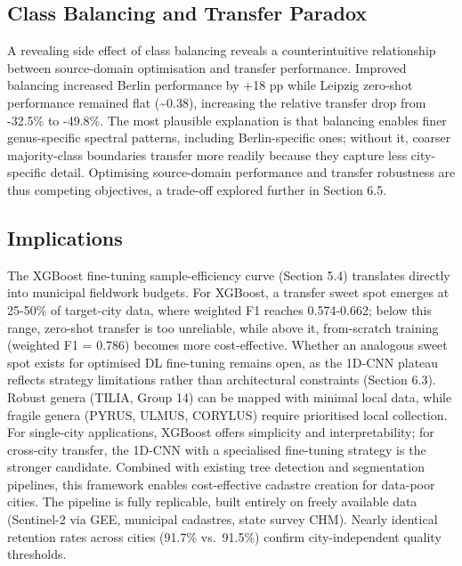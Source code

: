 \documentclass[11pt,a4paper]{scrartcl}
\begin{document}
\subsection{Class Balancing and Transfer
Paradox}\label{class-balancing-and-transfer-paradox}

A revealing side effect of class balancing reveals a counterintuitive
relationship between source-domain optimisation and transfer
performance. Improved balancing increased Berlin performance by +18 pp
while Leipzig zero-shot performance remained flat (\textasciitilde0.38),
increasing the relative transfer drop from -32.5\% to -49.8\%. The most
plausible explanation is that balancing enables finer genus-specific
spectral patterns, including Berlin-specific ones; without it, coarser
majority-class boundaries transfer more readily because they capture
less city-specific detail. Optimising source-domain performance and
transfer robustness are thus competing objectives, a trade-off explored
further in Section 6.5.

\subsection{Implications}\label{implications}

The XGBoost fine-tuning sample-efficiency curve (Section 5.4) translates
directly into municipal fieldwork budgets. For XGBoost, a transfer sweet
spot emerges at 25-50\% of target-city data, where weighted F1 reaches
0.574-0.662; below this range, zero-shot transfer is too unreliable,
while above it, from-scratch training (weighted F1 = 0.786) becomes more
cost-effective. Whether an analogous sweet spot exists for optimised DL
fine-tuning remains open, as the 1D-CNN plateau reflects strategy
limitations rather than architectural constraints (Section 6.3). Robust
genera (TILIA, Group 14) can be mapped with minimal local data, while
fragile genera (PYRUS, ULMUS, CORYLUS) require prioritised local
collection. For single-city applications, XGBoost offers simplicity and
interpretability; for cross-city transfer, the 1D-CNN with a specialised
fine-tuning strategy is the stronger candidate. Combined with existing
tree detection and segmentation pipelines, this framework enables
cost-effective cadastre creation for data-poor cities. The pipeline is
fully replicable, built entirely on freely available data (Sentinel-2
via GEE, municipal cadastres, state survey CHM). Nearly identical
retention rates across cities (91.7\% vs.~91.5\%) confirm
city-independent quality thresholds.
\end{document}
